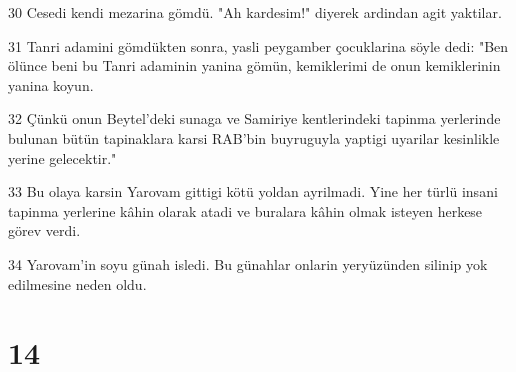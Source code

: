 \par 30 Cesedi kendi mezarina gömdü. "Ah kardesim!" diyerek ardindan agit yaktilar.
\par 31 Tanri adamini gömdükten sonra, yasli peygamber çocuklarina söyle dedi: "Ben ölünce beni bu Tanri adaminin yanina gömün, kemiklerimi de onun kemiklerinin yanina koyun.
\par 32 Çünkü onun Beytel'deki sunaga ve Samiriye kentlerindeki tapinma yerlerinde bulunan bütün tapinaklara karsi RAB'bin buyruguyla yaptigi uyarilar kesinlikle yerine gelecektir."
\par 33 Bu olaya karsin Yarovam gittigi kötü yoldan ayrilmadi. Yine her türlü insani tapinma yerlerine kâhin olarak atadi ve buralara kâhin olmak isteyen herkese görev verdi.
\par 34 Yarovam'in soyu günah isledi. Bu günahlar onlarin yeryüzünden silinip yok edilmesine neden oldu.

\chapter{14}

